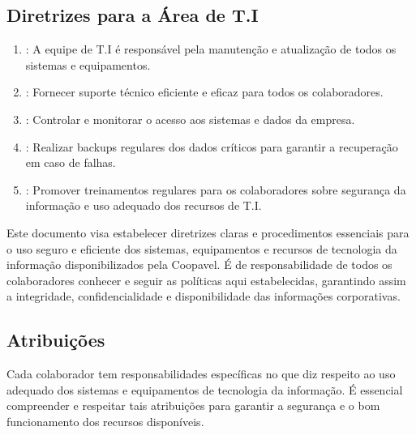 \documentclass[letterpaper,10pt,brazil]{sphinxmanual}
\begin{document}
\subsection{Diretrizes para a Área de T.I}
\label{\detokenize{regras:diretrizes-para-a-area-de-t-i}}\begin{enumerate}
%
\item {} 
\sphinxAtStartPar
{}: A equipe de T.I é responsável pela manutenção e atualização de todos os sistemas e equipamentos.

\item {} 
\sphinxAtStartPar
{}: Fornecer suporte técnico eficiente e eficaz para todos os colaboradores.

\item {} 
\sphinxAtStartPar
{}: Controlar e monitorar o acesso aos sistemas e dados da empresa.

\item {} 
\sphinxAtStartPar
{}: Realizar backups regulares dos dados críticos para garantir a recuperação em caso de falhas.

\item {} 
\sphinxAtStartPar
{}: Promover treinamentos regulares para os colaboradores sobre segurança da informação e uso adequado dos recursos de T.I.

\end{enumerate}

\sphinxAtStartPar
Este documento visa estabelecer diretrizes claras e procedimentos essenciais para o uso
seguro e eficiente dos sistemas, equipamentos e recursos de tecnologia da informação
disponibilizados pela Coopavel. É de responsabilidade de todos os colaboradores
conhecer e seguir as políticas aqui estabelecidas, garantindo assim a integridade,
confidencialidade e disponibilidade das informações corporativas.


\subsection{Atribuições}
\label{\detokenize{regras:atribuicoes}}
\sphinxAtStartPar
Cada colaborador tem responsabilidades específicas no que diz respeito ao uso adequado
dos sistemas e equipamentos de tecnologia da informação. É essencial compreender e
respeitar tais atribuições para garantir a segurança e o bom funcionamento dos recursos
disponíveis.
\end{document}
